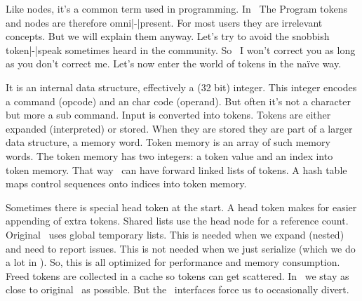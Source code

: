 

\startdocument
  [title={TOKENS},
   banner={tokens as I see them},
   location={context\enspace {\bf 2020}\enspace meeting}]

\starttitle[title=About tokens]

\startitemize

\startitem Like nodes, it's a common term used in programming. \stopitem
\startitem In \TEX\ The Program tokens and nodes are therefore omni|-|present. \stopitem
\startitem For most users they are irrelevant concepts. \stopitem
\startitem But we will explain them anyway. \stopitem
\startitem Let's try to avoid the snobbish token|-|speak sometimes heard in the community. \stopitem
\startitem So \unknown\ I won't correct you as long as you don't correct me. \stopitem
\startitem Let's now enter the world of tokens in the na\"ive way. \stopitem

\stopitemize

\stoptitle

\starttitle[title=What are tokens]

\startitemize

\startitem It is an internal data structure, effectively a (32 bit) integer. \stopitem
\startitem This integer encodes a command (opcode) and an char code (operand). \stopitem
\startitem But often it's not a character but more a sub command. \stopitem
\startitem Input is converted into tokens. \stopitem
\startitem Tokens are either expanded (interpreted) or stored. \stopitem
\startitem When they are stored they are part of a larger data structure, a memory word. \stopitem
\startitem Token memory is an array of such memory words. \stopitem
\startitem The token memory  has two integers: a token value and an index into token memory. \stopitem
\startitem That way \TEX\ can have forward linked lists of tokens. \stopitem
\startitem A hash table maps control sequences onto indices into token memory. \stopitem

\stopitemize

\starttitle[title=Some implementation details]

\startitemize

\startitem Sometimes there is special head token at the start. \stopitem
\startitem A head token makes for easier appending of extra tokens. \stopitem
\startitem Shared lists use the head node for a reference count. \stopitem
\startitem Original \TEX\ uses global temporary lists. \stopitem
\startitem This is needed when we expand (nested) and need to report issues. \stopitem
\startitem This is not needed when we just serialize (which we do a lot in \LUATEX). \stopitem
\startitem So, this is all optimized for performance and memory consumption. \stopitem
\startitem Freed tokens are collected in a cache so tokens can get scattered. \stopitem
\startitem In \LUAMETATEX\ we stay as close to original \TEX\ as possible. \stopitem
\startitem But the \LUA\ interfaces force us to occasionally divert. \stopitem


